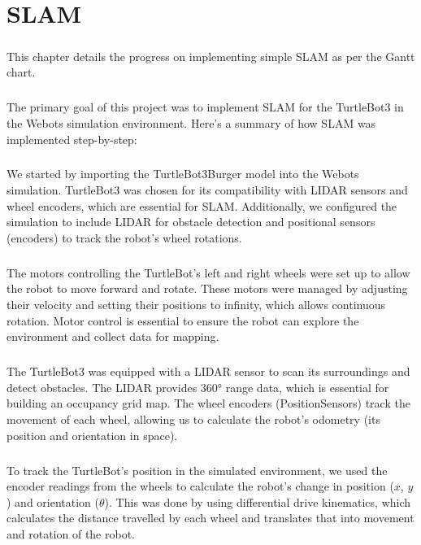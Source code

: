 \chapter{SLAM}

\paragraph*{}
This chapter details the progress on implementing simple SLAM as per the Gantt chart. 

\paragraph*{}
The primary goal of this project was to implement SLAM for the TurtleBot3 in the Webots simulation environment. Here’s a summary of how SLAM was implemented step-by-step:

\paragraph*{}
We started by importing the TurtleBot3Burger model into the Webots simulation. TurtleBot3 was chosen for its compatibility with LIDAR sensors and wheel encoders, which are essential for SLAM. Additionally, we configured the simulation to include LIDAR for obstacle detection and positional sensors (encoders) to track the robot’s wheel rotations.

\paragraph*{}
The motors controlling the TurtleBot’s left and right wheels were set up to allow the robot to move forward and rotate. These motors were managed by adjusting their velocity and setting their positions to infinity, which allows continuous rotation. Motor control is essential to ensure the robot can explore the environment and collect data for mapping.

\paragraph*{}
The TurtleBot3 was equipped with a LIDAR sensor to scan its surroundings and detect obstacles. The LIDAR provides 360° range data, which is essential for building an occupancy grid map. The wheel encoders (PositionSensors) track the movement of each wheel, allowing us to calculate the robot’s odometry (its position and orientation in space).

\paragraph*{}
To track the TurtleBot’s position in the simulated environment, we used the encoder readings from the wheels to calculate the robot’s change in position ($x$, $y$) and orientation ($\theta$). This was done by using differential drive kinematics, which calculates the distance travelled by each wheel and translates that into movement and rotation of the robot.

